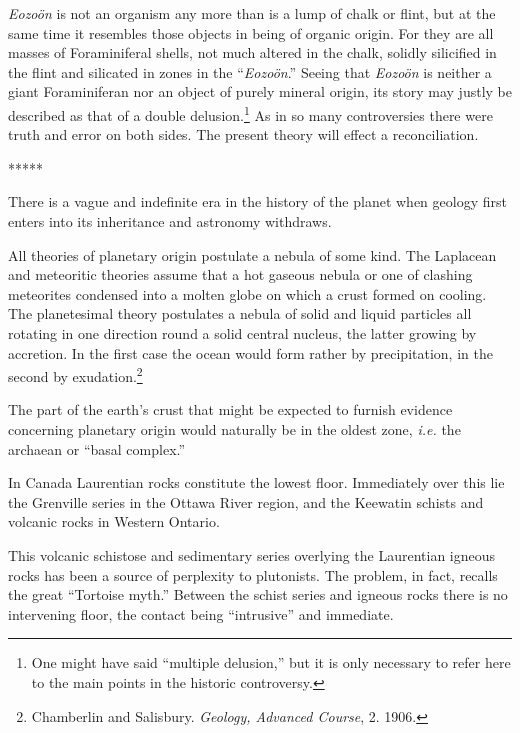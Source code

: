 \documentclass[a4paper, 12pt, oneside]{article}
\begin{document}
\emph{Eozoön} is not an organism any more than is a lump of chalk or flint, but at the same time it resembles those objects in being of organic origin. For they are all masses of Foraminiferal shells, not much altered in the chalk, solidly silicified in the flint and silicated in zones in the ``\emph{Eozoön}.'' Seeing that \emph{Eozoön} is neither a giant Foraminiferan nor an object of purely mineral origin, its story may justly be described as that of a double delusion.\footnote{One might have said ``multiple delusion,'' but it is only necessary to refer here to the main points in the historic controversy.} As in so many controversies there were truth and error on both sides. The present theory will effect a reconciliation.

\centerline{*\hspace{15mm}*\hspace{15mm}*\hspace{15mm}*\hspace{15mm}*}
\bigskip

There is a vague and indefinite era in the history of the planet when geology first enters into its inheritance and astronomy withdraws.

All theories of planetary origin postulate a nebula of some kind. The Laplacean and meteoritic theories assume that a hot gaseous nebula or one of clashing meteorites condensed into a molten globe on which a crust formed on cooling. The planetesimal theory postulates a nebula of solid and liquid particles all rotating in one direction round a solid central nucleus, the latter growing by accretion. In the first case the ocean would form rather by precipitation, in the second by exudation.\footnote{Chamberlin and Salisbury. \emph{Geology, Advanced Course}, 2. 1906.}

The part of the earth's crust that might be expected to furnish evidence concerning planetary origin would naturally be in the oldest zone, \emph{i.e.} the archaean or ``basal complex.''

In Canada Laurentian rocks constitute the lowest floor. Immediately over this lie the Grenville series in the Ottawa River region, and the Keewatin schists and volcanic rocks in Western Ontario.

This volcanic schistose and sedimentary series overlying the Laurentian igneous rocks has been a source of perplexity to plutonists. The problem, in fact, recalls the great ``Tortoise myth.'' Between the schist series and igneous rocks there is no intervening floor, the contact being ``intrusive'' and immediate.
\end{document}
